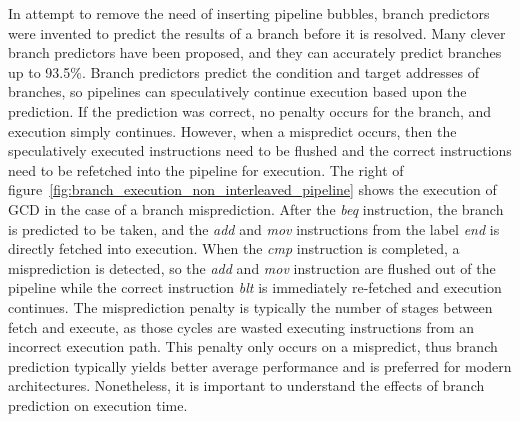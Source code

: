 In attempt to remove the need of inserting pipeline bubbles, branch predictors were invented to predict the results of a branch before it is resolved.
Many clever branch predictors have been proposed, and they can accurately predict branches up to 93.5\%.
Branch predictors predict the condition and target addresses of branches, so pipelines can speculatively continue execution based upon the prediction.  
If the prediction was correct, no penalty occurs for the branch, and execution simply continues. 
However, when a mispredict occurs, then the speculatively executed instructions need to be flushed and the correct instructions need to be refetched into the pipeline for execution.
The right of figure~\ref{fig:branch_execution_non_interleaved_pipeline} shows the execution of GCD in the case of a branch misprediction.
After the \emph{beq} instruction, the branch is predicted to be taken, and the \emph{add} and \emph{mov} instructions from the label \emph{end} is directly fetched into execution. 
When the \emph{cmp} instruction is completed, a misprediction is detected, so the \emph{add} and \emph{mov} instruction are flushed out of the pipeline while the correct instruction \emph{blt} is immediately re-fetched and execution continues.
The misprediction penalty is typically the number of stages between fetch and execute, as those cycles are wasted executing instructions from an incorrect execution path.
This penalty only occurs on a mispredict, thus branch prediction typically yields better average performance and is preferred for modern architectures.
Nonetheless, it is important to understand the effects of branch prediction on execution time. 

